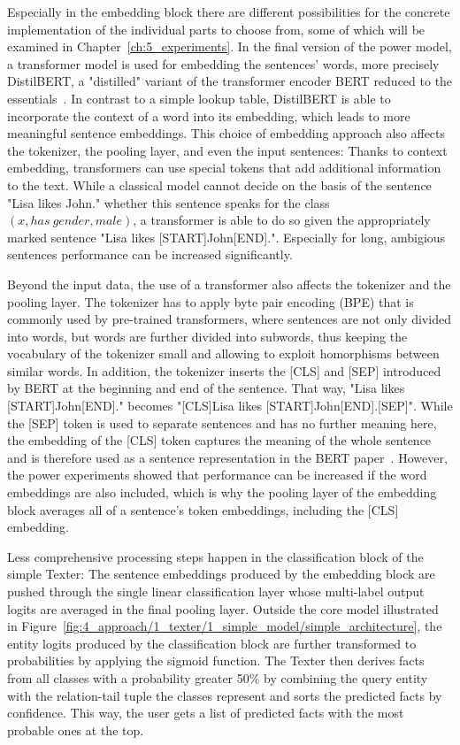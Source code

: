 Especially in the embedding block there are different possibilities for the concrete implementation of the individual parts to choose from, some of which will be examined in Chapter~\ref{ch:5_experiments}. In the final version of the power model, a transformer model is used for embedding the sentences' words, more precisely DistilBERT, a "distilled" variant of the transformer encoder BERT reduced to the essentials~\cite{Sanh2019DistilBERTAD}. In contrast to a simple lookup table, DistilBERT is able to incorporate the context of a word into its embedding, which leads to more meaningful sentence embeddings. This choice of embedding approach also affects the tokenizer, the pooling layer, and even the input sentences: Thanks to context embedding, transformers can use special tokens that add additional information to the text. While a classical model cannot decide on the basis of the sentence "Lisa likes John." whether this sentence speaks for the class $(x, has~gender, male)$, a transformer is able to do so given the appropriately marked sentence "Lisa likes [START]John[END].". Especially for long, ambigious sentences performance can be increased significantly.

Beyond the input data, the use of a transformer also affects the tokenizer and the pooling layer. The tokenizer has to apply byte pair encoding (BPE) that is commonly used by pre-trained transformers, where sentences are not only divided into words, but words are further divided into subwords, thus keeping the vocabulary of the tokenizer small and allowing to exploit homorphisms between similar words. In addition, the tokenizer inserts the [CLS] and [SEP] introduced by BERT at the beginning and end of the sentence. That way, "Lisa likes [START]John[END]." becomes "[CLS]Lisa likes [START]John[END].[SEP]". While the [SEP] token is used to separate sentences and has no further meaning here, the embedding of the [CLS] token captures the meaning of the whole sentence and is therefore  used as a sentence representation in the BERT paper~\cite{Devlin2019BERTPO}. However, the power experiments showed that performance can be increased if the word embeddings are also included, which is why the pooling layer of the embedding block averages all of a sentence's token embeddings, including the [CLS] embedding.

Less comprehensive processing steps happen in the classification block of the simple Texter: The sentence embeddings produced by the embedding block are pushed through the single linear classification layer whose multi-label output logits are averaged in the final pooling layer. Outside the core model illustrated in Figure~\ref{fig:4_approach/1_texter/1_simple_model/simple_architecture}, the entity logits produced by the classification block are further transformed to probabilities by applying the sigmoid function. The Texter then derives facts from all classes with a probability greater 50\% by combining the query entity with the relation-tail tuple the classes represent and sorts the predicted facts by confidence. This way, the user gets a list of predicted facts with the most probable ones at the top.
